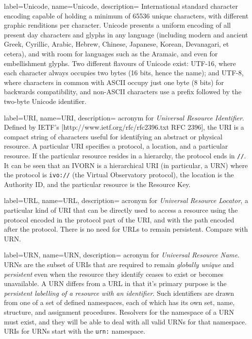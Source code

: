 {
    label={Unicode},
    name={Unicode},
    description={
		International standard character encoding capable of
		holding a minimum of 65536 unique characters, with
		different graphic renditions per character. Unicode
		presents a uniform encoding of all present day characters
		and glyphs in any language (including modern and ancient
		Greek, Cyrillic, Arabic, Hebrew, Chinese, Japanese, Korean,
		Devanagari, et cetera), and with room for languages such as
		the Aramaic, and even for embellishment glyphs. Two
		different flavours of Unicode exist: UTF-16, where each
		character always occupies two bytes (16 bits, hence the
		name); and UTF-8, where characters in common with
		\gls{ASCII} occupy just one byte (8 bits) for backwards
		compatibility, and non-ASCII characters use a prefix
		followed by the two-byte Unicode identifier.
    }
}

{
    label={URI},
    name={URI},
    description={
    	acronym for \emph{Universal Resource Identifier}. Defined by
        \gls{IETF}'s [http://www.ietf.org/rfc/rfc2396.txt RFC 2396],
        the URI is a compact string of characters useful for
        identifying an abstract or physical resource. A particular URI
        specifies a protocol, a location, and a particular resource. If
        the particular resource resides in a hierarchy, the protocol
        ends in \texttt{//}. It can be seen that an \gls{IVORN} is a
        hierarchical \gls{URI} (in particular, a \gls{URN}) where the
        protocol is \texttt{ivo://} (the Virtual Observatory protocol),
        the location is the Authority ID, and the particular resource
        is the Resource Key.
    }
}

{
    label={URL},
    name={URL},
    description={
    	acronym for \emph{Universal Resource Locator}, a particular
        kind of \gls{URI} that can be directly used to access a
        resource using the protocol encoded in the protocol part of the
        URI, and with the path encoded after the protocol. There is no
        need for URLs to remain persistent. Compare with \gls{URN}.
    }
}

{
    label={URN},
    name={URN},
    description={
    	acronym for \emph{Universal Resource Name}. URNs are the subset
        of \gls{URI}s that are required to remain \emph{globally
        unique} and \emph{persistent} even when the resource they
        identify ceases to exist or becomes unavailable. A URN differs
        from a \gls{URL} in that it's primary purpose is the
        \emph{persistent labelling of a resource with an identifier}.
        Such identifiers are drawn from one of a set of defined
        namespaces, each of which has its own set, name, structure, and
        assignment procedures. Resolvers for the namespace of a URN
        must exist, and they will be able to deal with all valid URNs
        for that namespace. URIs for URNs start with the \texttt{urn:}
        namespace.
    }
}


